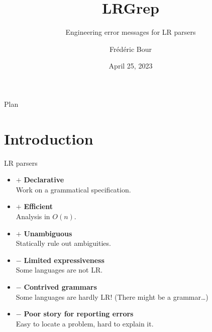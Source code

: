 \documentclass[aspectratio=169]{beamer}          %
\title{LRGrep}  %
\subtitle{Engineering error messages for LR parsers}
\author{Frédéric Bour}                %
\institute{Tarides, Inria}          %
\date{April 25, 2023}                  %
\begin{document}
\begin{frame}
  \titlepage
\end{frame}

\begin{frame}{Plan}
  \tableofcontents
\end{frame}


\section{Introduction}

\newcommand\pro{\item[$+$]}
\newcommand\con{\item[$-$]}

\begin{frame}{LR parsers}

  \begin{itemize}
    \pro \textbf{Declarative} \\
         {\small Work on a grammatical specification.}
    \pro \textbf{Efficient} \\
         {\small Analysis in $O(n)$.}
    \pro \textbf{Unambiguous} \\
         {\small Statically rule out ambiguities.}
    \pause
    \con \textbf{Limited expressiveness} \\
         {\small Some languages are not LR.}
    \con \textbf{Contrived grammars} \\
         {\small Some languages are hardly LR! (There might be a grammar\ldots)}
    \con \textbf{Poor story for reporting errors} \\
         {\small Easy to locate a problem, hard to explain it.}
  \end{itemize}

\end{frame}
\end{document}
